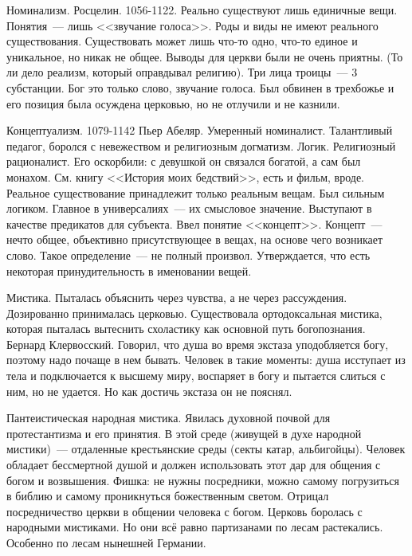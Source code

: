 Номинализм.
Росцелин. 1056-1122. Реально существуют лишь единичные вещи. Понятия~--- лишь <<звучание голоса>>. Роды и виды не имеют реального существования. Существовать может лишь что-то одно, что-то единое и уникальное, но никак не общее. Выводы для церкви были не очень приятны. (То ли дело реализм, который оправдывал религию). Три лица троицы~--- 3 субстанции. Бог это только слово, звучание голоса. Был обвинен в трехбожье и его позиция была осуждена церковью, но не отлучили и не казнили.

Концептуализм. 1079-1142 Пьер Абеляр. Умеренный номиналист. Талантливый педагог, боролся с невежеством и религиозным догматизм. Логик. Религиозный рационалист. Его оскорбили: с девушкой он связался богатой, а сам был монахом. См. книгу <<История моих бедствий>>, есть и фильм, вроде. Реальное существование принадлежит только реальным вещам. Был сильным логиком. Главное в универсалиях~--- их смысловое значение. Выступают в качестве предикатов для субъекта. Ввел понятие <<концепт>>. Концепт~--- нечто общее, объективно присутствующее в вещах, на основе чего возникает слово. Такое определение~--- не полный произвол. Утверждается, что есть некоторая принудительность в именовании вещей.

Мистика. Пыталась объяснить через чувства, а не через рассуждения. Дозированно принималась церковью. Существовала ортодоксальная мистика, которая пыталась вытеснить схоластику как основной путь богопознания. Бернард Клервосский. Говорил, что душа во время экстаза уподобляется богу, поэтому надо почаще в нем бывать. Человек в такие моменты: душа исступает из тела и подключается к высшему миру, воспаряет в богу и пытается слиться с ним, но не удается. Но как достичь экстаза он не пояснял.

Пантеистическая народная мистика. Явилась духовной почвой для протестантизма и его принятия. В этой среде (живущей в духе народной мистики)~--- отдаленные крестьянские среды (секты катар, альбигойцы). Человек обладает бессмертной душой и должен использовать этот дар для общения с богом и возвышения. Фишка: не нужны посредники, можно самому погрузиться в библию и самому проникнуться божественным светом. Отрицал посредничество церкви в общении человека с богом. Церковь боролась с народными мистиками. Но они всё равно партизанами по лесам растекались. Особенно по лесам нынешней Германии.

